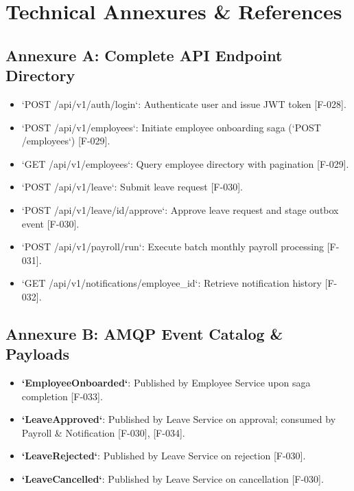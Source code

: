 \documentclass[11pt,a4paper]{article}
\begin{document}
\section{Technical Annexures \& References}

\subsection{Annexure A: Complete API Endpoint Directory}
\begin{itemize}
    \item `POST /api/v1/auth/login`: Authenticate user and issue JWT token [F-028].
    \item `POST /api/v1/employees`: Initiate employee onboarding saga (`POST /employees`) [F-029].
    \item `GET /api/v1/employees`: Query employee directory with pagination [F-029].
    \item `POST /api/v1/leave`: Submit leave request [F-030].
    \item `POST /api/v1/leave/{id}/approve`: Approve leave request and stage outbox event [F-030].
    \item `POST /api/v1/payroll/run`: Execute batch monthly payroll processing [F-031].
    \item `GET /api/v1/notifications/{employee\_id}`: Retrieve notification history [F-032].
\end{itemize}

\subsection{Annexure B: AMQP Event Catalog \& Payloads}
\begin{itemize}
    \item \textbf{`EmployeeOnboarded`}: Published by Employee Service upon saga completion [F-033].
    \item \textbf{`LeaveApproved`}: Published by Leave Service on approval; consumed by Payroll \& Notification [F-030], [F-034].
    \item \textbf{`LeaveRejected`}: Published by Leave Service on rejection [F-030].
    \item \textbf{`LeaveCancelled`}: Published by Leave Service on cancellation [F-030].
\end{itemize}
\end{document}
